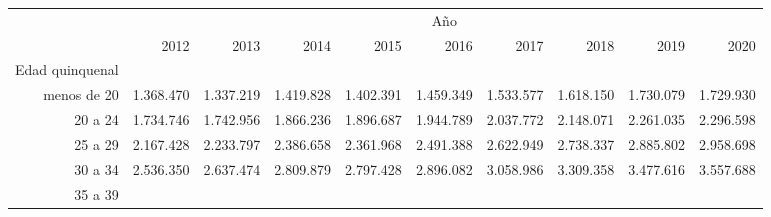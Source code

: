 \begin{tabular}{llllllllll}
\cline{1-10}
\multicolumn{1}{c}{} &
  \multicolumn{9}{|c}{Año} \\
\multicolumn{1}{c}{} &
  \multicolumn{1}{|r}{2012} &
  \multicolumn{1}{r}{2013} &
  \multicolumn{1}{r}{2014} &
  \multicolumn{1}{r}{2015} &
  \multicolumn{1}{r}{2016} &
  \multicolumn{1}{r}{2017} &
  \multicolumn{1}{r}{2018} &
  \multicolumn{1}{r}{2019} &
  \multicolumn{1}{r}{2020} \\
\cline{1-10}
\multicolumn{1}{r}{Edad quinquenal} &
  \multicolumn{1}{|r}{} &
  \multicolumn{1}{r}{} &
  \multicolumn{1}{r}{} &
  \multicolumn{1}{r}{} &
  \multicolumn{1}{r}{} &
  \multicolumn{1}{r}{} &
  \multicolumn{1}{r}{} &
  \multicolumn{1}{r}{} &
  \multicolumn{1}{r}{} \\
\multicolumn{1}{r}{menos de 20\hspace{1em}} &
  \multicolumn{1}{|r}{1.368.470} &
  \multicolumn{1}{r}{1.337.219} &
  \multicolumn{1}{r}{1.419.828} &
  \multicolumn{1}{r}{1.402.391} &
  \multicolumn{1}{r}{1.459.349} &
  \multicolumn{1}{r}{1.533.577} &
  \multicolumn{1}{r}{1.618.150} &
  \multicolumn{1}{r}{1.730.079} &
  \multicolumn{1}{r}{1.729.930} \\
\multicolumn{1}{r}{20 a 24\hspace{1em}} &
  \multicolumn{1}{|r}{1.734.746} &
  \multicolumn{1}{r}{1.742.956} &
  \multicolumn{1}{r}{1.866.236} &
  \multicolumn{1}{r}{1.896.687} &
  \multicolumn{1}{r}{1.944.789} &
  \multicolumn{1}{r}{2.037.772} &
  \multicolumn{1}{r}{2.148.071} &
  \multicolumn{1}{r}{2.261.035} &
  \multicolumn{1}{r}{2.296.598} \\
\multicolumn{1}{r}{25 a 29\hspace{1em}} &
  \multicolumn{1}{|r}{2.167.428} &
  \multicolumn{1}{r}{2.233.797} &
  \multicolumn{1}{r}{2.386.658} &
  \multicolumn{1}{r}{2.361.968} &
  \multicolumn{1}{r}{2.491.388} &
  \multicolumn{1}{r}{2.622.949} &
  \multicolumn{1}{r}{2.738.337} &
  \multicolumn{1}{r}{2.885.802} &
  \multicolumn{1}{r}{2.958.698} \\
\multicolumn{1}{r}{30 a 34\hspace{1em}} &
  \multicolumn{1}{|r}{2.536.350} &
  \multicolumn{1}{r}{2.637.474} &
  \multicolumn{1}{r}{2.809.879} &
  \multicolumn{1}{r}{2.797.428} &
  \multicolumn{1}{r}{2.896.082} &
  \multicolumn{1}{r}{3.058.986} &
  \multicolumn{1}{r}{3.309.358} &
  \multicolumn{1}{r}{3.477.616} &
  \multicolumn{1}{r}{3.557.688} \\
\multicolumn{1}{r}{35 a 39\hspace{1em}} &

\end{tabular}
